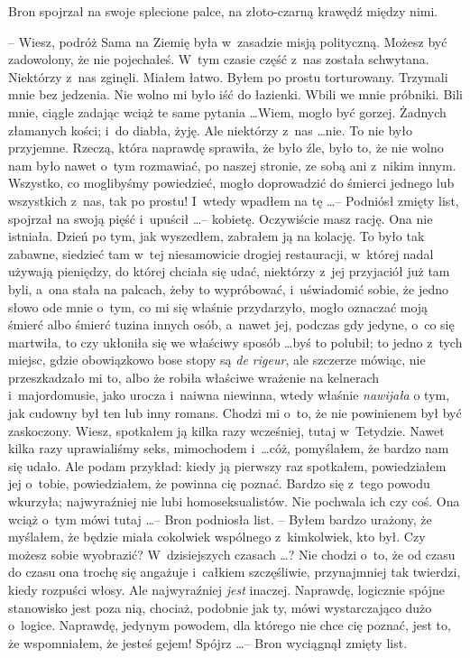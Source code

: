 \documentclass[oneside,polish,11pt,rmheadings]{mwbk}
\begin{document}
Bron spojrzał na swoje splecione palce, na złoto-czarną krawędź między nimi. 

-- Wiesz, podróż Sama na Ziemię była w~zasadzie misją polityczną. Możesz być zadowolony, że nie pojechałeś. W~tym czasie część z~nas została schwytana. Niektórzy z~nas zginęli. Miałem łatwo. Byłem po prostu torturowany. Trzymali mnie bez jedzenia. Nie wolno mi było iść do łazienki. Wbili we mnie próbniki. Bili mnie, ciągle zadając wciąż te same pytania \ldots  Wiem, mogło być gorzej. Żadnych złamanych kości; i~do diabła, żyję. Ale niektórzy z~nas \ldots  nie. To nie było przyjemne. Rzeczą, która naprawdę sprawiła, że było źle, było to, że nie wolno nam było nawet o~tym rozmawiać, po naszej stronie, ze sobą ani z~nikim innym. Wszystko, co moglibyśmy powiedzieć, mogło doprowadzić do śmierci jednego lub wszystkich z~nas, tak po prostu! I~wtedy wpadłem na tę \ldots  -- Podniósł zmięty list, spojrzał na swoją pięść i~upuścił \ldots  -- kobietę. Oczywiście masz rację. Ona nie istniała. Dzień po tym, jak wyszedłem, zabrałem ją na kolację. To było tak zabawne, siedzieć tam w~tej niesamowicie drogiej restauracji, w~której nadal używają pieniędzy, do której chciała się udać, niektórzy z~jej przyjaciół już tam byli, a~ona stała na palcach, żeby to wypróbować, i~uświadomić sobie, że jedno słowo ode mnie o~tym, co mi się właśnie przydarzyło, mogło oznaczać moją śmierć albo śmierć tuzina innych osób, a~nawet jej, podczas gdy jedyne, o~co się martwiła, to czy ukłoniła się we właściwy sposób \ldots  byś to polubił; to jedno z~tych miejsc, gdzie obowiązkowo bose stopy są \textit{de rigeur}, ale szczerze mówiąc, nie przeszkadzało mi to, albo że robiła właściwe wrażenie na kelnerach i~majordomusie, jako urocza i~naiwna niewinna,  wtedy właśnie \textit{nawijała }o tym, jak cudowny był ten lub inny romans. Chodzi mi o~to, że nie powinienem był być zaskoczony. Wiesz, spotkałem ją kilka razy wcześniej, tutaj w~Tetydzie. Nawet kilka razy uprawialiśmy seks, mimochodem i~\ldots  cóż, pomyślałem, że bardzo nam się udało. Ale podam przykład: kiedy ją pierwszy raz spotkałem, powiedziałem jej o~tobie, powiedziałem, że powinna cię poznać. Bardzo się z~tego powodu wkurzyła; najwyraźniej nie lubi homoseksualistów. Nie pochwala ich czy coś. Ona wciąż o~tym mówi tutaj \ldots  -- Bron podniosła list. -- Byłem bardzo urażony, że myślałem, że będzie miała cokolwiek wspólnego z~kimkolwiek, kto był. Czy możesz sobie wyobrazić? W~dzisiejszych czasach \ldots ? Nie chodzi o~to, że od czasu do czasu ona trochę się angażuje i~całkiem szczęśliwie, przynajmniej tak twierdzi, kiedy rozpuści włosy. Ale najwyraźniej \textit{jest }inaczej. Naprawdę, logicznie spójne stanowisko jest poza nią, chociaż, podobnie jak ty, mówi wystarczająco dużo o~logice. Naprawdę, jedynym powodem, dla którego nie chce cię poznać, jest to, że wspomniałem, że jesteś gejem! Spójrz \ldots  -- Bron wyciągnął zmięty list. 
\end{document}
